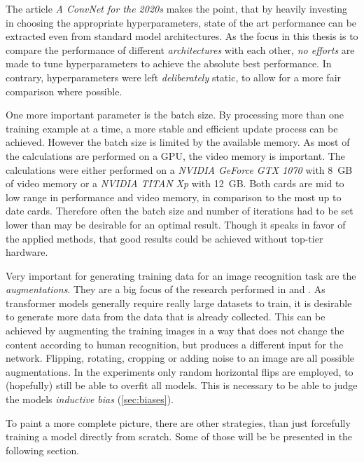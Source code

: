 The article \emph{A ConvNet for the 2020s} \cite{convNetForThe2020s} makes the point, that by heavily investing in choosing the appropriate hyperparameters, state of the art performance can be extracted even from \glqq standard\grqq{} model architectures. 
As the focus in this thesis is to compare the performance of different \emph{architectures} with each other, \emph{no efforts} are made to tune hyperparameters to achieve the absolute best performance. 
In contrary, hyperparameters were left \emph{deliberately} static, to allow for a more fair comparison where possible.

One more important parameter is the batch size. 
By processing more than one training example at a time, a more stable and efficient update process can be achieved.
However the batch size is limited by the available memory. 
As most of the calculations are performed on a GPU, the video memory is important. 
The calculations were either performed on a \emph{NVIDIA GeForce GTX 1070} with \SI[]{8}[]{GB} of video memory or a \emph{NVIDIA TITAN Xp} with \SI[]{12}[]{GB}. 
Both cards are mid to low range in performance and video memory, in comparison to the most up to date cards. 
Therefore often the batch size and number of iterations had to be set lower than may be desirable for an optimal result. Though it speaks in favor of the applied methods, that good results could be achieved without top-tier hardware.

Very important for generating training data for an image recognition task are the \emph{augmentations}. 
They are a big focus of the research performed in \cite{convNetForThe2020s} and \cite{dinoPaper}.
As transformer models generally require really large datasets to train, it is desirable to generate more data from the data that is already collected. 
This can be achieved by augmenting the training images in a way that does not change the content according to human recognition, but produces a different input for the network.
Flipping, rotating, cropping or adding noise to an image are all possible augmentations. 
In the experiments only random horizontal flips are employed, to (hopefully) still be able to overfit all models. 
This is necessary to be able to judge the models \emph{inductive bias} (\autoref{sec:biases}).

To paint a more complete picture, there are other strategies, than just forcefully training a model directly from scratch. 
Some of those will be be presented in the following section.